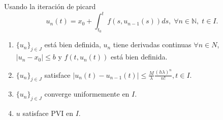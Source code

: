 \begin{note}
  Usando la iteración de picard
  \[ 
    u_{n}(t) = x_{0} + \int_{t_{0}}^{t} f(s, u_{n-1}(s)) ds, \; \forall n \in \mathbb{N}, \; t \in I.
  \] 
  \begin{enumerate}[label=(\roman*)]
    \item $\{ u_{n} \}_{j \in J}$ está bien definida, $u_{n}$ tiene derivadas continuas $\forall n \in N$, $| u_{n} - x_{0} | \leq b$ y $f(t, u_{n}(t))$ está bien definida.
    \item $\{ u_{n} \}_{j \in J}$ satisface $| u_{n}(t) - u_{n-1}(t) | \leq \frac{M}{\lambda}\frac{(h \lambda)^{n}}{n!}, t \in I$.
    \item $\{ u_{n} \}_{j \in J}$ converge uniformemente en $I$.
    \item $u$ satisface PVI en $I$.
  \end{enumerate}
\end{note}

